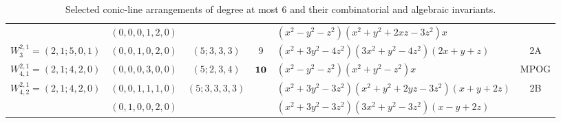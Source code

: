 \documentclass[11pt]{article}
\theoremstyle{plain}
\theoremstyle{definition}
\begin{document}
\begin{landscape}
\begin{table}[h!]
\begin{tabular}{@{}llcclc@{}}
 &
$(0,0,0,1,2,0)$ & & & $(x^2-y^2-z^2)(x^2+y^2+2xz-3z^2)x$  & \\
\hdashline

  $W_3^{2,1}=(2,1;5,0,1)$ & $(0,0,1,0,2,0)$ & $(5;3,3,3)$ & 9 & $(x^2+3y^2-4z^2)(3x^2+y^2-4z^2)(2x+y+z)$ & 2A \\

\hdashline

 $W_{4,1}^{2,1}=(2,1;4,2,0)$ & $(0,0,0,3,0,0)$ & $(5;2,3,4)$ & \multirow{3}{*}{\underline{ $\bf 10$ }} & $(x^2-y^2-z^2)(x^2+y^2-z^2)x$  & MPOG \\
 
 \multirow{2}{*}{$W_{4,2}^{2,1}=(2,1;4,2,0)$} & $(0,0,1,1,1,0)$ & \multirow{2}{*}{$(5;3,3,3,3)$} &  & $(x^2+3y^2-3z^2)(x^2+y^2+2yz-3z^2)(x+y+2z)$ & \multirow{2}{*}{2B}  \\

& $(0,1,0,0,2,0)$ & &  & $(x^2+3y^2-3z^2)(3x^2+y^2-3z^2)(x-y+2z)$ &   \\
 
  
  
  
 \bottomrule
 \end{tabular}
 \caption*{Selected conic-line arrangements of degree at most \(6\) and their combinatorial and algebraic invariants.}
 \end{table}
\end{landscape}
\end{document}
